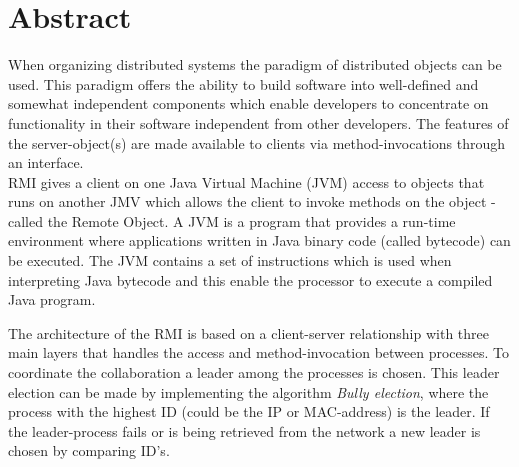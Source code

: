 \documentclass[Main]{subfiles}
\begin{document}
\chapter*{Abstract}

When organizing distributed systems the paradigm of distributed objects can be used. This paradigm offers the ability to build software into well-defined and somewhat independent components which enable developers to concentrate on functionality in their software independent from other developers. The features of the server-object(s) are made available to clients via method-invocations through an interface.\\RMI gives a client on one Java Virtual Machine (JVM) access to objects that runs on another JMV which allows the client to invoke methods on the object - called the Remote Object. A JVM is a program that provides a run-time environment where applications written in Java binary code (called bytecode) can be executed. The JVM contains a set of instructions which is used when interpreting Java bytecode and this enable the processor to execute a compiled Java program.


The architecture of the RMI is based on a client-server relationship with three main layers that handles the access and method-invocation between processes. To coordinate the collaboration a leader among the processes is chosen. This leader election can be made by implementing the algorithm \textit{Bully election}, where the process with the highest ID (could be the IP or MAC-address) is the leader. If the leader-process fails or is being retrieved from the network a new leader is chosen by comparing ID's.



\setcounter{tocdepth}{1}
\tableofcontents
\end{document}
